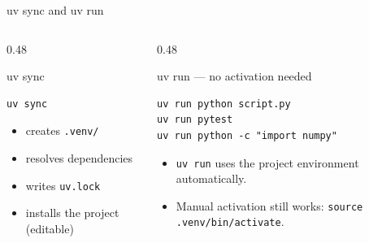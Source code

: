 \documentclass[aspectratio=169]{beamer}
\begin{document}
\begin{frame}[fragile]{uv sync and uv run}
  \begin{columns}[T]
    \begin{column}{0.48\textwidth}
      \begin{block}{uv sync}
        \begin{lstlisting}
uv sync
        \end{lstlisting}
        \begin{itemize}
          \item creates \texttt{.venv/}
          \item resolves dependencies
          \item writes \texttt{uv.lock}
          \item installs the project (editable)
        \end{itemize}
      \end{block}
    \end{column}
    \begin{column}{0.48\textwidth}
      \begin{block}{uv run --- no activation needed}
        \begin{lstlisting}
uv run python script.py
uv run pytest
uv run python -c "import numpy"
        \end{lstlisting}
      \end{block}
      \begin{itemize}
        \item \texttt{uv run} uses the project environment automatically.
        \item Manual activation still works:
              \texttt{source .venv/bin/activate}.
      \end{itemize}
    \end{column}
  \end{columns}
\end{frame}
\end{document}
